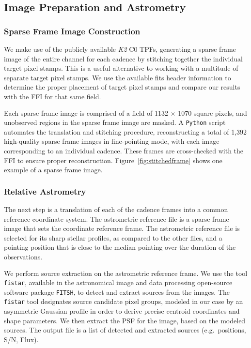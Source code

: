 \documentclass[apjl]{emulateapj}
\begin{document}
\subsection{Image Preparation and Astrometry}
\label{sec:astrom}

\subsubsection{Sparse Frame Image Construction}
We make use of the publicly available \textit{K2} C0 TPFs, generating a
sparse frame image of the entire channel for each cadence by stitching
together the individual target pixel stamps.  This is a useful
alternative to working with a multitude of separate target pixel
stamps. We use the available fits header information to determine the
proper placement of target pixel stamps and compare our results with the
FFI for that same field.

Each sparse frame image is comprised of a field of 1132 $\times$ 1070
square pixels, and unobserved regions in the sparse frame image are
masked. A \texttt{Python} script automates the translation and stitching
procedure, reconstructing a total of 1,392 high-quality sparse frame
images in fine-pointing mode, with each image corresponding to an
individual cadence.  These frames are cross-checked with the FFI to
ensure proper reconstruction.  Figure~\ref{fig:stitchedframe} shows one
example of a sparse frame image.

\subsubsection{Relative Astrometry}

The next step is a translation of each of the cadence frames into a
common reference coordinate system.  The astrometric reference file is a
sparse frame image that sets the coordinate reference frame. The
astrometric reference file is selected for its sharp stellar profiles,
as compared to the other files, and a pointing position that is close to
the median pointing over the duration of the observations.

We perform source extraction on the astrometric reference frame.  We use
the tool \texttt{fistar}, available in the astronomical image and data
processing open-source software package \texttt{FITSH}, to detect and
extract sources from the images. The \texttt{fistar} tool designates
source candidate pixel groups, modeled in our case by an asymmetric
Gaussian profile in order to derive precise centroid coordinates and
shape parameters. We then extract the PSF for the image, based on the
modeled sources. The output file is a list of detected and extracted
sources (e.g.\ positions, S/N, Flux).
\end{document}

